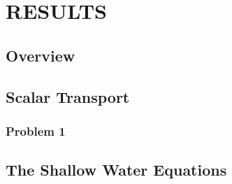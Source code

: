 \chapter{RESULTS}

\section{Overview}
  
\section{Scalar Transport\label{sec:transport_results}}
\subsection{Problem 1}
  
\section{The Shallow Water Equations\label{sec:shallow_water_results}}
